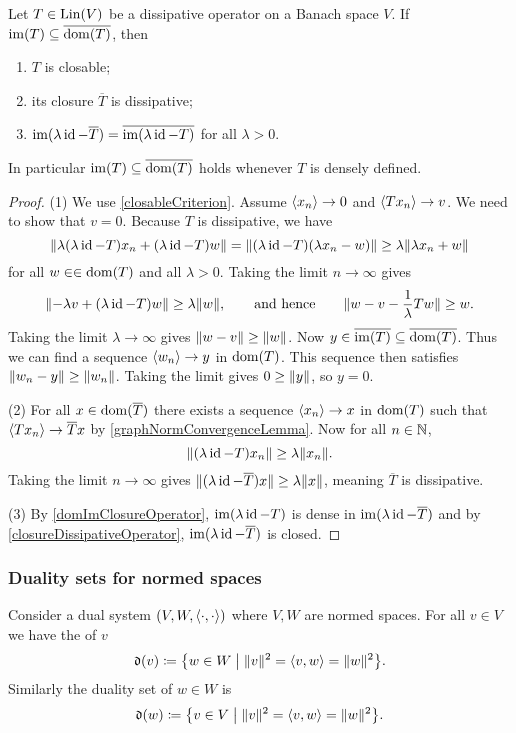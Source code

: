 \begin{proposition} \label{dissipativeOperatorClosable}
Let $T\in \operatorname{Lin}(V)$ be a dissipative operator on a Banach space $V$. If $\operatorname{im}(T)\subseteq \overline{\operatorname{dom}(T)}$, then
\begin{enumerate}
\item $T$ is closable;
\item its closure $\overline{T}$ is dissipative;
\item $\operatorname{im}(\lambda\operatorname{id} - \overline{T}) = \overline{\operatorname{im}(\lambda\operatorname{id} - T)}$ for all $\lambda >0$.
\end{enumerate}
\end{proposition}
In particular $\operatorname{im}(T)\subseteq \overline{\operatorname{dom}(T)}$ holds whenever $T$ is densely defined.
\begin{proof}
(1) We use \ref{closableCriterion}. Assume $\left\langle x_n \right\rangle\to 0$ and $\left\langle Tx_n \right\rangle\to v$. We need to show that $v=0$. Because $T$ is dissipative, we have
\[ \lVert\lambda(\lambda\operatorname{id}-T)x_n + (\lambda\operatorname{id}-T)w\rVert = \lVert(\lambda\operatorname{id}-T)(\lambda x_n -w)\rVert \geq \lambda\lVert\lambda x_n + w\rVert \]
for all $w\in \in\operatorname{dom}(T)$ and all $\lambda>0$. Taking the limit $n\to \infty$ gives
\[ \lVert-\lambda v +(\lambda\operatorname{id}- T)w\rVert \geq \lambda\lVert w\rVert, \qquad\text{and hence}\qquad \lVert w - v - \frac{1}{\lambda}Tw\rVert \geq w. \]
Taking the limit $\lambda \to \infty$ gives $\lVert w-v\rVert\geq \lVert w\rVert$. Now $y\in \overline{\operatorname{im}(T)} \subseteq \overline{\operatorname{dom}(T)}$. Thus we can find a sequence $\left\langle w_n \right\rangle\to y$ in $\operatorname{dom}(T)$. This sequence then satisfies $\lVert w_n-y\rVert \geq \lVert w_n\rVert$. Taking the limit gives $0\geq \lVert y\rVert$, so $y = 0$.

(2) For all $x\in\operatorname{dom}(\overline{T})$ there exists a sequence $\left\langle x_n \right\rangle\to x$ in $\operatorname{dom}(T)$ such that $\left\langle Tx_n \right\rangle \to \overline{T}x$ by \ref{graphNormConvergenceLemma}. Now for all $n\in \mathbb{N}$,
\[ \lVert(\lambda\operatorname{id}-T)x_n\rVert \geq \lambda\lVert x_n\rVert. \]
Taking the limit $n\to\infty$ gives $\lVert(\lambda\operatorname{id}-\overline{T})x\rVert \geq \lambda\lVert x\rVert$, meaning $\overline{T}$ is dissipative.

(3) By \ref{domImClosureOperator}, $\operatorname{im}(\lambda\operatorname{id} - T)$ is dense in $\operatorname{im}(\lambda\operatorname{id}-\overline{T})$ and by \ref{closureDissipativeOperator}, $\operatorname{im}(\lambda\operatorname{id}-\overline{T})$ is closed.
\end{proof}

\subsubsection{Duality sets for normed spaces}
\begin{definition}
Consider a dual system $\sSet{V, W, \pair{\cdot,\cdot}}$ where $V,W$ are normed spaces. For all $v\in V$ we have the  of $v$
\[ \dualitySet(v) \defeq \setbuilder{w\in W}{\norm{v}^2 = \pair{v,w} = \norm{w}^2}. \]
Similarly the duality set of $w\in W$ is
\[ \dualitySet(w) \defeq \setbuilder{v\in V}{\norm{v}^2 = \pair{v,w} = \norm{w}^2}. \]
\end{definition}

